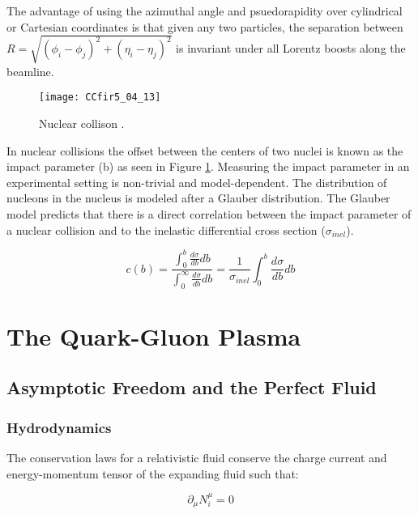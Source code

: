 \noindent
The advantage of using the azimuthal angle and psuedorapidity over cylindrical or Cartesian coordinates is that given any two particles, the separation between $R = \sqrt{ (\phi_{i} - \phi_{j})^{2} + (\eta_{i} - \eta_{j})^{2}  } $ is invariant under all Lorentz boosts along the beamline.


\begin{figure}[h]
\texttt{[image: CCfir5\_04\_13]}
\centering
\caption{Nuclear collison  .}
\label{fig:centrality}
\end{figure}

\noindent
In nuclear collisions the offset between the centers of two nuclei is known as the impact parameter (b) as seen in Figure \ref{fig:centrality}.  Measuring the impact parameter in an experimental setting is non-trivial and model-dependent.  The distribution of nucleons in the nucleus is modeled after a Glauber distribution\cite{Loizides:2016djv}.  The Glauber model predicts that there is a direct correlation between the impact parameter of a nuclear collision and to the inelastic differential cross section ($\sigma_{inel}$)\cite{Miller:2007ri}.


\begin{equation}
c(b) =\frac{ \int_{0}^{b} \frac{d \sigma}{db} db}{ \int_{0}^{\infty} \frac{d \sigma}{db} db} = \frac{1}{\sigma_{inel}} \int_{0}^{b} \frac{d \sigma}{db} db
\label{eq:centrality}
\end{equation}






\section{The Quark-Gluon Plasma}

\subsection{Asymptotic Freedom and the Perfect Fluid}

\subsubsection{Hydrodynamics}
The conservation laws for a relativistic fluid conserve the charge current and energy-momentum tensor of the expanding fluid such that:

\begin{equation}
\partial_{\mu} N_{\textit{i}}^{\mu} = 0
\label{eq:hydrochrg}
\end{equation}

